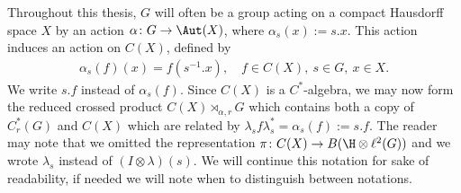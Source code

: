 Throughout this thesis, $G$ will often be a group acting on a compact Hausdorff space $X$ by an action $\alpha \colon G \to \Aut(X)$, where $\alpha_s (x):=s.x$. This action induces an action on $C(X)$, defined by
\begin{align*}
\alpha_s(f)(x)=f(s^{-1}.x),\quad f \in C(X),\ s \in G,\ x \in X.
\end{align*}
We write $s.f$ instead of $\alpha_s(f)$. Since $C(X)$ is a $C^*$-algebra, we may now form the reduced crossed product $C(X) \rtimes_{\alpha,r}G$ which contains both a copy of $C_r^*(G)$ and $C(X)$ which are related by $\lambda_s f \lambda_s^*=\alpha_s(f):=s.f$. The reader may note that we omitted the representation $\pi \colon C(X) \to B(\H \otimes \ell^2(G))$ and we wrote $\lambda_s$ instead of $(I \otimes \lambda)(s)$. We will continue this notation for sake of readability, if needed we will note when to distinguish between notations.
